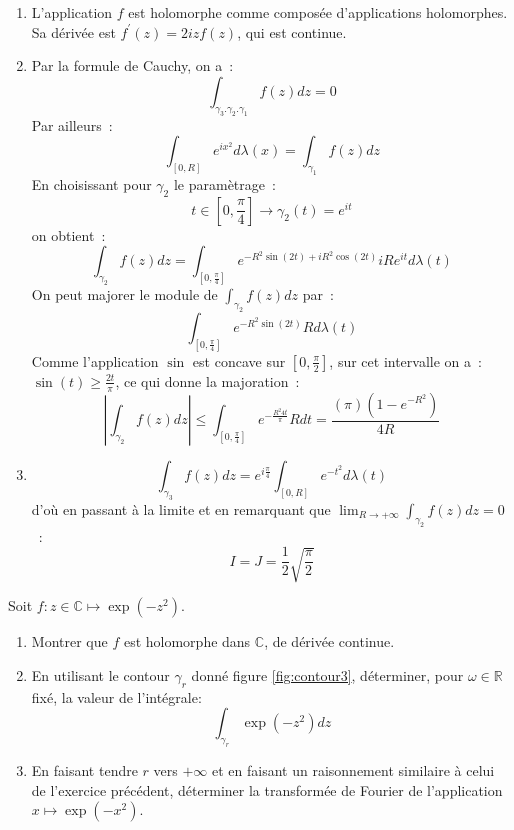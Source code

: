 \documentclass[a4paper, 12pt]{amsart}
\begin{document}
\begin{enumerate}
\item L'application $f$ est holomorphe comme composée d'applications
holomorphes. Sa dérivée est $f^\prime(z) = 2 i z f(z)$, qui est continue. 
\item
Par la formule de Cauchy, on a~:
\[
\int_{\gamma_3 . \gamma_2 . \gamma_1} f(z) dz = 0
\]
Par ailleurs~:
\[
\int_{[0,R]} e^{ix^2}d \lambda(x) = \int_{\gamma_1} f(z) dz
\]
En choisissant pour $\gamma_2$ le paramètrage~:
\[
t \in [0, \frac{\pi}{4}] \to \gamma_2(t) = e^{it}
\]
on obtient~:
\[
\int_{\gamma_2} f(z) dz = \int_{[0, \frac{\pi}{4}]} e^{-R^2 \sin (2t)
+ i R^2 \cos(2t)} i R e^{it} d \lambda(t)
\]
On peut majorer le module de $\int_{\gamma_2} f(z) dz$ par~:
\[
\int_{[0, \frac{\pi}{4}]} e^{-R^2 \sin (2t)}  R d \lambda(t)
\]
Comme l'application $\sin$ est concave sur $[0, \frac{\pi}{2}]$, sur
cet intervalle on a~: $\sin(t) \geq \frac{2 t}{\pi}$, ce qui donne la
majoration~:
\[
\left | \int_{\gamma_2} f(z) dz \right | \leq 
\int_{[0, \frac{\pi}{4}]} e^{-\frac{R^2 4 t}{\pi}} R dt =
\frac{(\pi)(1- e^{-R^2})}{4 R}
\]
\item
\[
\int_{\gamma_3} f(z) dz = e^{i \frac{\pi}{4}} \int_{[0,R]} e^{-t^2} d\lambda(t)
\]
d'où en passant à la limite et en remarquant que $\lim_{R \to
+\infty}\int_{\gamma_2} f(z) dz = 0$~:
\[
I = J = \frac{1}{2} \sqrt{\frac{\pi}{2}}
\]
\end{enumerate}
\begin{fex}
 Soit $f \colon z \in \mathbb{C} \mapsto \exp(-z^2)$.
\begin{enumerate}
  \item Montrer que $f$ est holomorphe dans $\mathbb{C}$, de dérivée continue.
  \item En utilisant le contour $\gamma_r$ donné figure \ref{fig:contour3},
déterminer, pour
  $\omega \in \mathbb{R}$ fixé, la valeur de l'intégrale:
  \[
  \int_{\gamma_r} \exp(-z^2)dz
  \]
  \item En faisant tendre $r$ vers $+\infty$ et en faisant un raisonnement
  similaire à celui de l'exercice précédent, déterminer la transformée de
  Fourier de l'application $x \mapsto \exp(-x^2)$.
\end{enumerate}
\end{fex}
\end{document}
